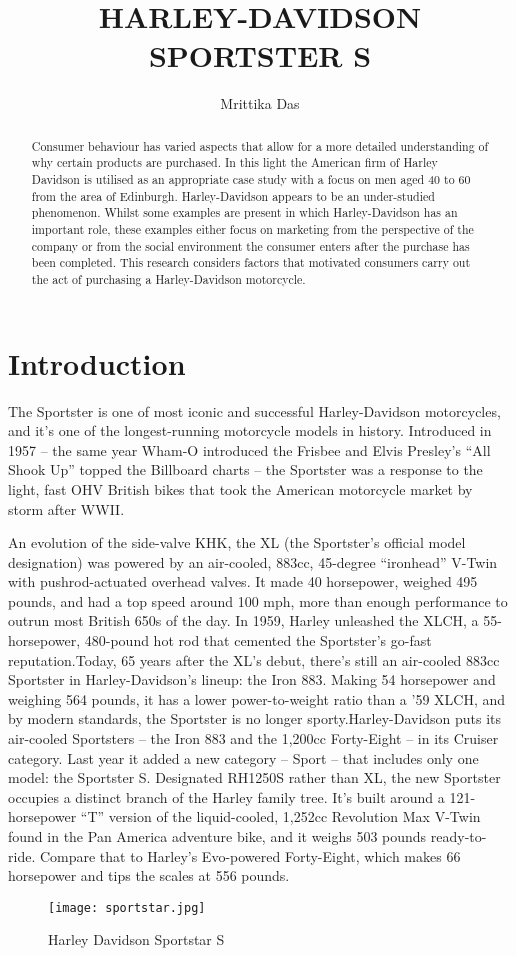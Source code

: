 \documentclass{article}
\title{
HARLEY-DAVIDSON SPORTSTER S}
\author{Mrittika Das}
\begin{document}
\maketitle

\begin{abstract}
Consumer behaviour has varied aspects that allow for a more detailed understanding
of why certain products are purchased. In this light the American firm of Harley Davidson is utilised as an appropriate case study with a focus on men aged 40 to 60
from the area of Edinburgh. Harley-Davidson appears to be an under-studied
phenomenon. Whilst some examples are present in which Harley-Davidson has an
important role, these examples either focus on marketing from the perspective of the
company or from the social environment the consumer enters after the purchase has
been completed. This research considers factors that motivated consumers carry out
the act of purchasing a Harley-Davidson motorcycle.
\end{abstract}

\section{Introduction}

The Sportster is one of most iconic and successful Harley-Davidson motorcycles, and it’s one of the longest-running motorcycle models in history. Introduced in 1957 – the same year Wham-O introduced the Frisbee and Elvis Presley’s “All Shook Up” topped the Billboard charts – the Sportster was a response to the light, fast OHV British bikes that took the American motorcycle market by storm after WWII.

An evolution of the side-valve KHK, the XL (the Sportster’s official model designation) was powered by an air-cooled, 883cc, 45-degree “ironhead” V-Twin with pushrod-actuated overhead valves. It made 40 horsepower, weighed 495 pounds, and had a top speed around 100 mph, more than enough performance to outrun most British 650s of the day. In 1959, Harley unleashed the XLCH, a 55-horsepower, 480-pound hot rod that cemented the Sportster’s go-fast reputation.Today, 65 years after the XL’s debut, there’s still an air-cooled 883cc Sportster in Harley-Davidson’s lineup: the Iron 883. Making 54 horsepower and weighing 564 pounds, it has a lower power-to-weight ratio than a ’59 XLCH, and by modern standards, the Sportster is no longer sporty.Harley-Davidson puts its air-cooled Sportsters – the Iron 883 and the 1,200cc Forty-Eight – in its Cruiser category. Last year it added a new category – Sport – that includes only one model: the Sportster S. Designated RH1250S rather than XL, the new Sportster occupies a distinct branch of the Harley family tree. It’s built around a 121-horsepower “T” version of the liquid-cooled, 1,252cc Revolution Max V-Twin found in the Pan America adventure bike, and it weighs 503 pounds ready-to-ride. Compare that to Harley’s Evo-powered Forty-Eight, which makes 66 horsepower and tips the scales at 556 pounds.
\begin{figure}
\centering
\texttt{[image: sportstar.jpg]}
\caption{\label{fig:sportstar S}Harley Davidson Sportstar S}
\end{figure}
\end{document}
